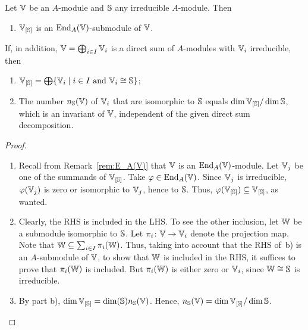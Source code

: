 \begin{lem}\label{lem:homogenous-decomposition}
    Let\/ $\mathbb V$ be an $A$-module and\/ $\mathbb S$ any irreducible\/ $A$-module. Then
    \begin{enumerate}[\rm a)]
        \item $\mathbb V_{[\mathbb S]}$ is an\/ ${\operatorname{End}}_A(\mathbb V)$-submodule of\/ $\mathbb V$.
    \end{enumerate}
    If, in addition, $\mathbb V = \bigoplus_{i\in I} \mathbb V_i$ is a direct sum of\/ $A$-modules with\/ $\mathbb V_i$ irreducible, then
    \begin{enumerate}[\rm a),start=2]        
        \item $\mathbb V_{[\mathbb S]} = \bigoplus\{\mathbb V_i\mid i\in I\text{\rm\ and } \mathbb V_i\cong\mathbb S\}$;
        
        \item The number\/ $n_{\mathbb S}(\mathbb V)$ of\/ $\mathbb V_i$ that are isomorphic to\/ $\mathbb S$ equals $\dim\mathbb V_{[\mathbb S]}/\dim\mathbb S$, which is an invariant of\/ $\mathbb V$, independent of the given direct sum decomposition.
    \end{enumerate}
\end{lem}

\begin{proof}${}$
    \begin{enumerate}[\rm a)]
        \item Recall from Remark~\ref{rem:E_A(V)} that $\mathbb V$ is an ${\operatorname{End}}_A(\mathbb V)$-module. Let $\mathbb V_j$ be one of the summands of $\mathbb V_{[\mathbb S]}$. Take $\varphi\in {\operatorname{End}}_A(\mathbb V)$. Since $\mathbb V_j$ is irreducible, $\varphi(\mathbb V_j)$ is zero or isomorphic to $\mathbb V_j$, hence to $\mathbb S$. Thus, $\varphi(\mathbb V_{[\mathbb S]})\subseteq\mathbb V_{[\mathbb S]}$, as wanted.

        \item Clearly, the RHS is included in the LHS. To see the other inclusion, let\/ $\mathbb W$ be a submodule isomorphic to\/ $\mathbb S$. Let\/ $\pi_i\colon \mathbb V \to \mathbb V_i$ denote the projection map. Note that\/ $\mathbb W \subseteq \sum_{i\in I} \pi_i(\mathbb W)$. Thus, taking into account that the RHS of~b) is an\/ $A$-submodule of\/ $\mathbb V$, to show that\/ $\mathbb W$ is included in the RHS, it suffices to prove that\/ $\pi_i(\mathbb W)$ is included. But\/ $\pi_i(\mathbb W)$ is either zero or\/ $\mathbb V_i$, since\/ $\mathbb W \cong \mathbb S$ is irreducible.


        \item By part b), $\dim\mathbb V_{[\mathbb S]}=\dim(\mathbb S)n_\mathbb S(\mathbb V)$. Hence, $n_\mathbb S(\mathbb V)=\dim\mathbb V_{[\mathbb S]}/\dim\mathbb S$.
    \end{enumerate}
\end{proof}

